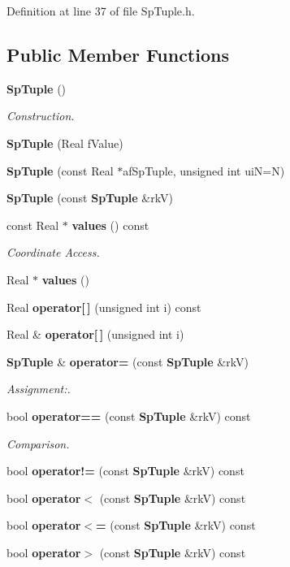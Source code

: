Definition at line 37 of file Sp\-Tuple.h.\subsection*{Public Member Functions}
\begin{CompactItemize}
\item 
{\bf Sp\-Tuple} ()
\begin{CompactList}\small\item\em Construction. \item\end{CompactList}\item 
{\bf Sp\-Tuple} (Real f\-Value)
\item 
{\bf Sp\-Tuple} (const Real $\ast$af\-Sp\-Tuple, unsigned int ui\-N=N)
\item 
{\bf Sp\-Tuple} (const {\bf Sp\-Tuple} \&rk\-V)
\item 
const Real $\ast$ {\bf values} () const
\begin{CompactList}\small\item\em Coordinate Access. \item\end{CompactList}\item 
Real $\ast$ {\bf values} ()
\item 
Real {\bf operator[$\,$]} (unsigned int i) const
\item 
Real \& {\bf operator[$\,$]} (unsigned int i)
\item 
{\bf Sp\-Tuple} \& {\bf operator=} (const {\bf Sp\-Tuple} \&rk\-V)
\begin{CompactList}\small\item\em Assignment:. \item\end{CompactList}\item 
bool {\bf operator==} (const {\bf Sp\-Tuple} \&rk\-V) const
\begin{CompactList}\small\item\em Comparison. \item\end{CompactList}\item 
bool {\bf operator!=} (const {\bf Sp\-Tuple} \&rk\-V) const
\item 
bool {\bf operator$<$} (const {\bf Sp\-Tuple} \&rk\-V) const
\item 
bool {\bf operator$<$=} (const {\bf Sp\-Tuple} \&rk\-V) const
\item 
bool {\bf operator$>$} (const {\bf Sp\-Tuple} \&rk\-V) const
\item 

\end{CompactItemize}
